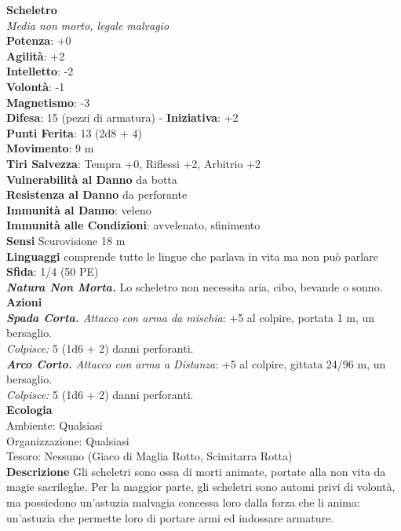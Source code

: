 \begin{multicols}{2}
\medskip\textbf{Scheletro}\\
\emph{Media non morto, legale malvagio}\\
\textbf{Potenza}: +0\\
\textbf{Agilità}: +2\\
\textbf{Intelletto}: -2\\
\textbf{Volontà}: -1\\
\textbf{Magnetismo}: -3\\
\textbf{Difesa}: 15 (pezzi di armatura) - \textbf{Iniziativa}: +2\\
\textbf{Punti Ferita}: 13 (2d8 + 4)\\
\textbf{Movimento}: 9 m\\
\textbf{Tiri Salvezza}: Tempra +0, Riflessi +2, Arbitrio +2\\
\textbf{Vulnerabilità al Danno} da botta\\
\textbf{Resistenza al Danno} da perforante\\
\textbf{Immunità al Danno}: veleno\\
\textbf{Immunità alle Condizioni}: avvelenato, sfinimento\\
\textbf{Sensi} Scurovisione 18 m\\
\textbf{Linguaggi} comprende tutte le lingue che parlava in vita ma non può parlare\\
\textbf{Sfida}: 1/4 (50 PE)\smallskip\\
\emph{\textbf{Natura Non Morta.}} Lo scheletro non necessita aria, cibo, bevande o sonno.\\
\smallskip\textbf{Azioni}\\
\emph{\textbf{Spada Corta.} Attacco con arma da mischia}: +5 al colpire, portata 1 m, un bersaglio.\\
\emph{Colpisce:} 5 (1d6 + 2) danni perforanti.\\
\emph{\textbf{Arco Corto.} Attacco con arma a Distanza}: +5 al colpire, gittata 24/96 m, un bersaglio.\\
\emph{Colpisce:} 5 (1d6 + 2) danni perforanti.\\
\textbf{Ecologia}\\
Ambiente: Qualsiasi\\
Organizzazione: Qualsiasi\\
Tesoro: Nessuno (Giaco di Maglia Rotto, Scimitarra Rotta)\\
\textbf{Descrizione}
Gli scheletri sono ossa di morti animate, portate alla non vita da magie sacrileghe. Per la maggior parte, gli scheletri sono automi privi di volontà, ma possiedono un’astuzia malvagia concessa loro dalla forza che li anima: un’astuzia che permette loro di portare armi ed indossare armature.\\



\end{multicols}
